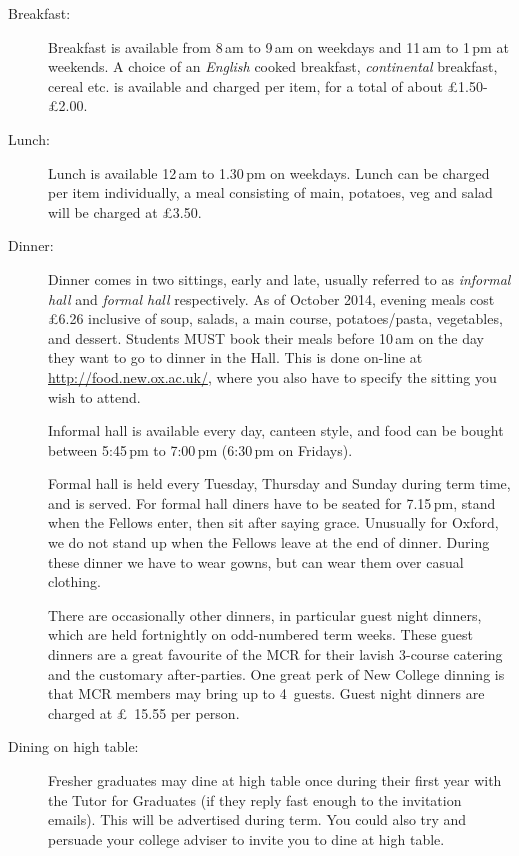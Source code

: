 \begin{description}
\item[Breakfast:] Breakfast is available from 8\,am to 9\,am on weekdays
and 11\,am to 1\,pm at weekends. A choice of an \emph{English} cooked breakfast,
\emph{continental} breakfast, cereal etc. is available and charged per item, for
a total of about \pounds1.50-\pounds2.00.
\item[Lunch:] Lunch is available 12\,am to 1.30\,pm on weekdays. Lunch can be
charged per item individually, a meal consisting of main, potatoes, veg and
salad will be charged at \pounds3.50.
\item[Dinner:] 
Dinner comes in two sittings, early and late, usually referred to as \emph{informal
hall} and  \emph{formal hall} respectively. As of
October 2014, evening meals cost \pounds6.26 inclusive of soup, salads, a main
course, potatoes/pasta, vegetables, and dessert. Students MUST book their meals before
10\,am on the day they want to go to dinner in the Hall. This is done on-line at
\url{http://food.new.ox.ac.uk/}, where you also have to specify the sitting you
wish to attend.

Informal hall is available every day, canteen style, and food can be bought
between 5:45\,pm to 7:00\,pm (6:30\,pm on Fridays). 

Formal hall is held every Tuesday, Thursday and
Sunday during term time, and is served. For formal hall diners
have to be seated for 7.15\,pm, stand when the Fellows enter, then sit after
saying grace. Unusually for Oxford, we do not stand up when the Fellows leave
at the end of dinner. During these dinner we have to wear gowns, but can wear
them over casual clothing.

There are occasionally other dinners, in particular guest night dinners, which
are held fortnightly on odd-numbered term weeks. These guest dinners are a great
favourite of the MCR for their lavish 3-course catering and the customary
after-parties. One great perk of New College dinning is that MCR members may
bring up to 4~guests. Guest night dinners are charged at \pounds~15.55 per
person.

\item[Dining on high table:] Fresher graduates may dine at high table once
during their first year with the Tutor for Graduates (if they reply fast enough
to the invitation emails).
This will be advertised during term. You could also try and persuade your college adviser to invite you to dine at high table.
\end{description}

